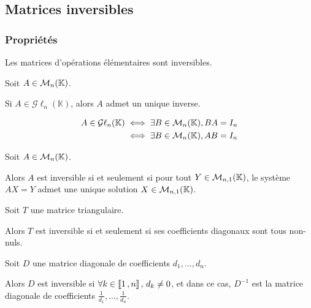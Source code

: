 \subsection{Matrices inversibles}

    \subsubsection{Propriétés}

    \begin{prop}{}{}
        Les matrices d’opérations élémentaires sont inversibles.
    \end{prop}

    \begin{prop}{}{}
        Soit $A \in \mathcal{M}_{n}(\mathbb{K})$.

        \begin{alors}
            \item Si $A \in \mathcal{G}\ell_n(\mathbb{K})$, alors $A$ admet un unique inverse.
            \item \begin{align*}
                A \in \mathcal{G}\ell_n(\mathbb{K}) & \iff \exists B \in \mathcal{M}_{n}(\mathbb{K}), BA = I_n \\
                & \iff \exists B \in \mathcal{M}_{n}(\mathbb{K}), AB = I_n 
            \end{align*}
        \end{alors}
    \end{prop}

    \begin{prop}{}{}
        Soit $A \in \mathcal{M}_{n}(\mathbb{K})$.

        Alors $A$ est inversible si et seulement si pour tout $Y \in \mathcal{M}_{n,1}(\mathbb{K})$, le système $AX = Y$ admet une unique solution $X \in \mathcal{M}_{n,1}(\mathbb{K})$.
    \end{prop}

    \begin{coro}{}{}
        Soit $T$ une matrice triangulaire. 

        Alors $T$ est inversible si et seulement si ses coefficients diagonaux sont tous non-nuls.
    \end{coro}

    \begin{coro}{}{}
        Soit $D$ une matrice diagonale de coefficients $d_1,\ldots,d_n$.

        Alors $D$ est inversible si $\forall k \in \left\llbracket 1 \, , n \right\rrbracket, \, d_k \neq 0$, et dans ce cas, $D^{-1}$ est la matrice diagonale de coefficients $\frac{1}{d_1},\ldots,\frac{1}{d_n}$.
    \end{coro}

